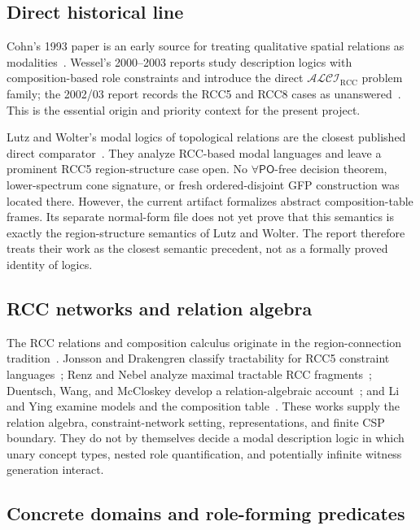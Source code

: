 \documentclass[11pt]{article}
\newcommand{\PO}{\mathsf{PO}}
\begin{document}
\subsection{Direct historical line}

Cohn's 1993 paper is an early source for treating qualitative spatial relations as
modalities~\cite{Cohn1993}. Wessel's 2000--2003 reports study description logics with
composition-based role constraints and introduce the direct
$\mathcal{ALCI}_{\mathrm{RCC}}$ problem family; the 2002/03 report records the RCC5 and
RCC8 cases as unanswered~\cite{Wessel2000SG,Wessel2001,Wessel2003}. This is the
essential origin and priority context for the present project.

Lutz and Wolter's modal logics of topological relations are the closest published
direct comparator~\cite{LutzWolter2006}. They analyze RCC-based modal languages and
leave a prominent RCC5 region-structure case open. No $\forall\PO$-free decision
theorem, lower-spectrum cone signature, or fresh ordered-disjoint GFP construction was
located there. However, the current artifact formalizes abstract composition-table
frames. Its separate normal-form file does not yet prove that this semantics is exactly
the region-structure semantics of Lutz and Wolter. The report therefore treats their
work as the closest semantic precedent, not as a formally proved identity of logics.

\subsection{RCC networks and relation algebra}

The RCC relations and composition calculus originate in the region-connection
tradition~\cite{RandellCuiCohn1992}. Jonsson and Drakengren classify tractability for
RCC5 constraint languages~\cite{JonssonDrakengren1997}; Renz and Nebel analyze maximal
tractable RCC fragments~\cite{RenzNebel1999}; Duentsch, Wang, and McCloskey develop a
relation-algebraic account~\cite{DuentschWangMcCloskey2001}; and Li and Ying examine
models and the composition table~\cite{LiYing2003}. These works supply the relation
algebra, constraint-network setting, representations, and finite CSP boundary. They do
not by themselves decide a modal description logic in which unary concept types,
nested role quantification, and potentially infinite witness generation interact.

\subsection{Concrete domains and role-forming predicates}
\end{document}
